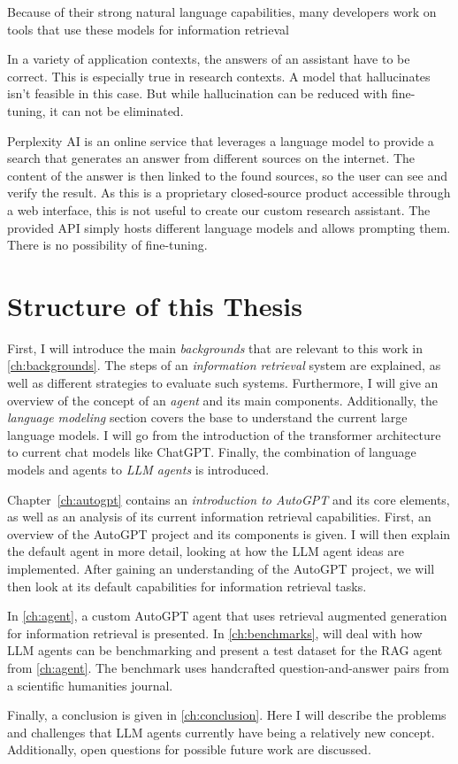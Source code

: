 \documentclass[../main.tex]{subfiles}
\begin{document}
Because of their strong natural language capabilities,
many developers work on tools that use these models for information retrieval

In a variety of application contexts,
the answers of an assistant have to be correct.
This is especially true in research contexts.
A model that hallucinates isn't feasible in this case.
But while hallucination can be reduced with fine-tuning,
it can not be eliminated.

Perplexity AI \cite{zotero-197} is an online service that leverages a language model
to provide a search that generates an answer from different sources on the internet.
The content of the answer is then linked to the found sources,
so the user can see and verify the result.
As this is a proprietary closed-source product accessible through a web interface,
this is not useful to create our custom research assistant.
The provided API simply hosts different language models and allows prompting them.
There is no possibility of fine-tuning.

\section{Structure of this Thesis}

First, I will introduce the main \emph{backgrounds} that are relevant to this work in \autoref{ch:backgrounds}.
The steps of an \emph{information retrieval} system are explained, as well
as different strategies to evaluate such systems.
Furthermore, I will give an overview of the concept of an \emph{agent} and its main components.
Additionally, the \emph{language modeling} section covers the base to understand the current large language models.
I will go from the introduction of the transformer architecture to current chat models like ChatGPT.
Finally, the combination of language models and agents to \emph{LLM agents} is introduced.

Chapter~\ref{ch:autogpt} contains an \emph{introduction to AutoGPT} and its core elements,
as well as an analysis of its current information retrieval capabilities.
First, an overview of the AutoGPT project and its components is given.
I will then explain the default agent in more detail,
looking at how the LLM agent ideas are implemented.
After gaining an understanding of the AutoGPT project,
we will then look at its default capabilities for information retrieval tasks.

In \autoref{ch:agent},
a custom AutoGPT agent that uses retrieval augmented generation for information retrieval is presented.
In \autoref{ch:benchmarks}, will deal with how LLM agents can be benchmarking
and present a test dataset for the RAG agent from \autoref{ch:agent}.
The benchmark uses handcrafted question-and-answer pairs from a scientific humanities journal.

Finally, a conclusion is given in \autoref{ch:conclusion}.
Here I will describe the problems and challenges
that LLM agents currently have being a relatively new concept.
Additionally, open questions for possible future work are discussed.
\end{document}
